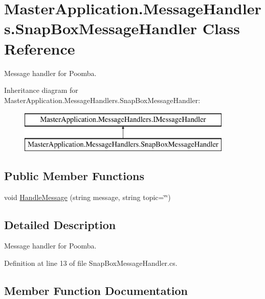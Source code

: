 \hypertarget{class_master_application_1_1_message_handlers_1_1_snap_box_message_handler}{}\section{Master\+Application.\+Message\+Handlers.\+Snap\+Box\+Message\+Handler Class Reference}
\label{class_master_application_1_1_message_handlers_1_1_snap_box_message_handler}


Message handler for Poomba.  


Inheritance diagram for Master\+Application.\+Message\+Handlers.\+Snap\+Box\+Message\+Handler\+:\begin{figure}[H]
\begin{center}
\leavevmode
\includegraphics[height=2.000000cm]{class_master_application_1_1_message_handlers_1_1_snap_box_message_handler}
\end{center}
\end{figure}
\subsection*{Public Member Functions}
\begin{DoxyCompactItemize}
\item 
void \mbox{\hyperlink{class_master_application_1_1_message_handlers_1_1_snap_box_message_handler_a83f2a6b8a014a225051ca8347a546539}{Handle\+Message}} (string message, string topic=\char`\"{}\char`\"{})
\end{DoxyCompactItemize}


\subsection{Detailed Description}
Message handler for Poomba. 

Definition at line 13 of file Snap\+Box\+Message\+Handler.\+cs.



\subsection{Member Function Documentation}
\mbox{\label{class_master_application_1_1_message_handlers_1_1_snap_box_message_handler_a83f2a6b8a014a225051ca8347a546539}} 
